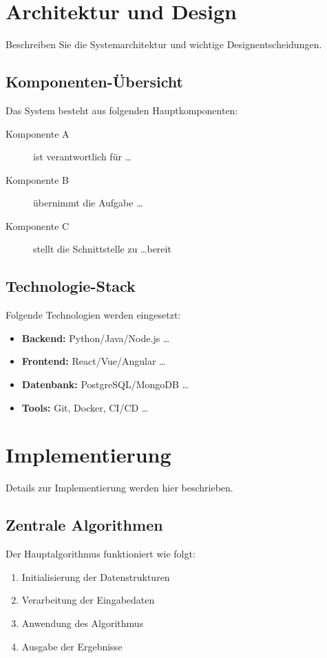 \section{Architektur und Design}
\label{sec:architektur}

Beschreiben Sie die Systemarchitektur und wichtige Designentscheidungen.

\subsection{Komponenten-Übersicht}

Das System besteht aus folgenden Hauptkomponenten:
\begin{description}
    \item[Komponente A] ist verantwortlich für \dots
    \item[Komponente B] übernimmt die Aufgabe \dots
    \item[Komponente C] stellt die Schnittstelle zu \dots bereit
\end{description}

\subsection{Technologie-Stack}

Folgende Technologien werden eingesetzt:
\begin{itemize}
    \item \textbf{Backend:} Python/Java/Node.js \dots
    \item \textbf{Frontend:} React/Vue/Angular \dots
    \item \textbf{Datenbank:} PostgreSQL/MongoDB \dots
    \item \textbf{Tools:} Git, Docker, CI/CD \dots
\end{itemize}

\section{Implementierung}
\label{sec:implementierung}

Details zur Implementierung werden hier beschrieben.

\subsection{Zentrale Algorithmen}

Der Hauptalgorithmus funktioniert wie folgt:
\begin{enumerate}
    \item Initialisierung der Datenstrukturen
    \item Verarbeitung der Eingabedaten
    \item Anwendung des Algorithmus
    \item Ausgabe der Ergebnisse
\end{enumerate}

